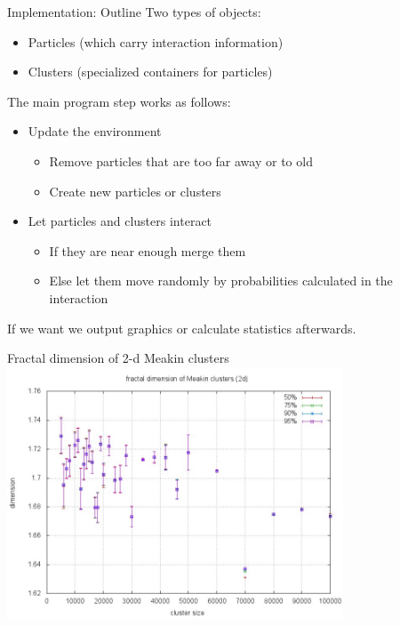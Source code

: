 \documentclass[smaller]{beamer}
\begin{document}
\begin{frame}{Implementation: Outline}
  Two types of objects:
  \begin{itemize}
    \item Particles (which carry interaction information) \pause
    \item Clusters (specialized containers for particles) \pause
  \end{itemize}\pause
  \vspace{0.3cm}
  The main program step works as follows:
  \begin{itemize}
    \item Update the environment \pause
      \begin{itemize}
        \item Remove particles that are too far away or to old
        \item Create new particles or clusters
      \end{itemize} \pause
    \item Let particles and clusters interact \pause
      \begin{itemize}
        \item If they are near enough merge them
        \item Else let them move randomly \pause
          by probabilities calculated in the interaction
      \end{itemize}
  \end{itemize} \pause
  If we want we output graphics or calculate statistics afterwards.
\end{frame}


            \begin{frame}{Fractal dimension of 2-d Meakin clusters}
                \includegraphics[width=10cm]{img/meakin_02.jpg}
            \end{frame}
\end{document}
